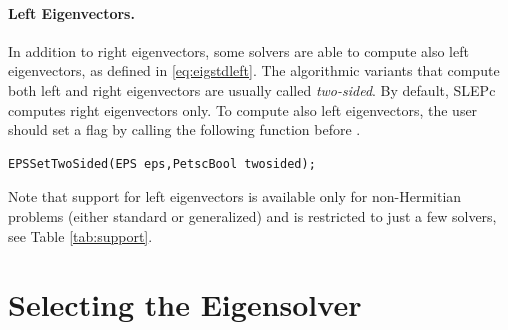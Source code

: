 \paragraph{Left Eigenvectors.}

In addition to right eigenvectors, some solvers are able to compute also left eigenvectors, as defined in \eqref{eq:eigstdleft}. The algorithmic variants that compute both left and right eigenvectors are usually called \emph{two-sided}. By default, SLEPc computes right eigenvectors only. To compute also left eigenvectors, the user should set a flag by calling the following function before .
	\begin{Verbatim}[fontsize=\small]
	EPSSetTwoSided(EPS eps,PetscBool twosided);
	\end{Verbatim}
Note that support for left eigenvectors is available only for non-Hermitian problems (either standard or generalized) and is restricted to just a few solvers, see Table \ref{tab:support}.

\section{Selecting the Eigensolver}

